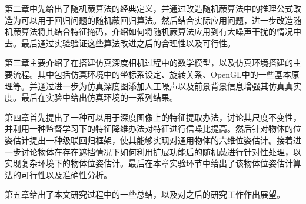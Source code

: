 第二章中先给出了随机蕨算法的经典定义，并通过改造随机蕨算法中的推理公式改造为可以用于回归问题的随机蕨回归算法。然后结合实际应用问题，进一步改造随机蕨算法将其结合特征掩码，介绍如何将随机蕨算法应用到有大噪声干扰的情况中去。最后通过实验验证这些算法改进之后的合理性以及可行性。

第三章主要介绍了在搭建仿真深度相机过程中的数学模型，以及仿真环境搭建的主要流程。其中包括仿真环境中的坐标系设定、旋转关系、OpenGL中的一些基本原理等。并通过进一步为仿真深度图添加人工噪声以及前景背景信息增强其仿真真实度。最后在实验中给出仿真环境的一系列结果。

第四章首先提出了一种可以用于深度图像上的特征提取办法，讨论其尺度不变性，并利用一种监督学习下的特征降维办法对特征进行信噪比提高。然后针对物体的位姿估计提出一种级联回归框架，使其能够实现对通用物体的六维位姿估计。接着进一步讨论物体在存在遮挡情况下如何利用扩展功能后的随机蕨进行针对性处理，以实现复杂环境下的物体位姿估计。最后在本章实验环节中给出了该物体位姿估计算法的可行性以及准确性分析。

第五章给出了本文研究过程中的一些总结，以及对之后的研究工作作出展望。














